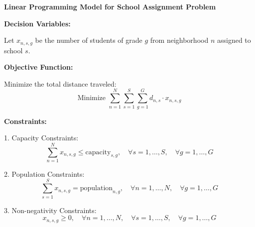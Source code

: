 \documentclass{article}
\begin{document}
\textbf{Linear Programming Model for School Assignment Problem}

\textbf{Decision Variables:}

Let \( x_{n,s,g} \) be the number of students of grade \( g \) from neighborhood \( n \) assigned to school \( s \).

\textbf{Objective Function:}

Minimize the total distance traveled:
\[
\text{Minimize } \sum_{n=1}^{N} \sum_{s=1}^{S} \sum_{g=1}^{G} d_{n,s} \cdot x_{n,s,g}
\]

\textbf{Constraints:}

1. Capacity Constraints:
\[
\sum_{n=1}^{N} x_{n,s,g} \leq \text{capacity}_{s,g}, \quad \forall s = 1, \ldots, S, \quad \forall g = 1, \ldots, G
\]

2. Population Constraints:
\[
\sum_{s=1}^{S} x_{n,s,g} = \text{population}_{n,g}, \quad \forall n = 1, \ldots, N, \quad \forall g = 1, \ldots, G
\]

3. Non-negativity Constraints:
\[
x_{n,s,g} \geq 0, \quad \forall n = 1, \ldots, N, \quad \forall s = 1, \ldots, S, \quad \forall g = 1, \ldots, G
\]
\end{document}
